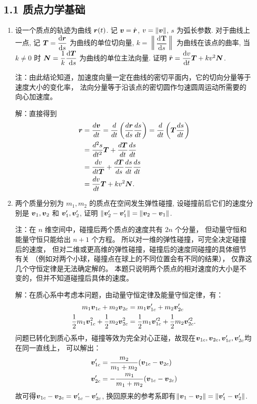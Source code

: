 \subsection{1.1 质点力学基础}
\begin{enumerate}
    \item 设一个质点的轨迹为曲线 $\boldsymbol{r}(t)$. 记 $\boldsymbol{v}=\dot{\boldsymbol{r}}$, $v=\|\boldsymbol{v}\|$, $s$ 为弧长参数.
    对于曲线上一点, 记 $\boldsymbol{T}=\dfrac{\mathrm{d} \boldsymbol{r}}{\mathrm{d} s}$ 为曲线的单位切向量, 
    $k=\left\|\dfrac{\mathrm{d} \boldsymbol{T}}{\mathrm{d} s}\right\|$ 为曲线在该点的曲率, 
    当 $k \neq 0$ 时 $\boldsymbol{N}=\dfrac{1}{k} \dfrac{\mathrm{d} \boldsymbol{T}}{\mathrm{~d} s}$ 为曲线的单位主法向量. 
    证明 $\ddot{\boldsymbol{r}}=\dfrac{\mathrm{d} v}{\mathrm{d} t} \boldsymbol{T}+k v^2 \boldsymbol{N}$.
    
    注：由此结论知道，加速度向量一定在曲线的密切平面内，它的切向分量等于速度大小的变化率，
    法向分量等于沿该点的密切圆作匀速圆周运动所需要的向心加速度。

    解：直接得到
    \begin{align*}
        \boldsymbol{r}&=\frac{d\boldsymbol{v}}{dt}=\frac{d}{dt}\left(\frac{d\boldsymbol{r}}{ds} \frac{ds}{dt}\right)
        =\frac{d}{dt}\left(\boldsymbol{T}\frac{ds}{dt}\right)\\
        &=\frac{d^2s}{dt^2}\boldsymbol{T}+\frac{d\boldsymbol{T}}{dt}\frac{ds}{dt}\\
        &=\frac{dv}{dt\boldsymbol{T}}+\frac{d\boldsymbol{T}}{ds}\frac{ds}{dt}\frac{ds}{dt}\\
        &=\frac{dv}{dt}\boldsymbol{T}+k v^2\boldsymbol{N}.
    \end{align*}

    \item 两个质量分别为 $m_1, m_2$ 的质点在空间发生弹性碰撞, 
    设碰撞前后它们的速度分别是 $\boldsymbol{v}_1, \boldsymbol{v}_2$ 和 $\boldsymbol{v}_1^{\prime}, \boldsymbol{v}_2^{\prime}$, 
    证明 $\|\boldsymbol{v}_2^{\prime}-\boldsymbol{v}_1^{\prime}\|=\|\boldsymbol{v}_2-\boldsymbol{v}_1\|$.
    
    注：在 $n$ 维空间中，碰撞后两个质点的速度共有 $2n$ 个分量，
    但动量守恒和能量守恒只能给出 $n+1$ 个方程。
    所以对一维的弹性碰撞，可完全决定碰撞后的速度，
    但对二维或更高维的弹性碰撞，碰撞后的速度同碰撞的具体细节有关
    （例如对两个小球，碰撞点在球上的不同位置会有不同的结果），
    仅靠这几个守恒定律是无法确定解的。
    本题只说明两个质点的相对速度的大小是不变的，但并不知道碰撞后具体的速度。

    解：在质心系中考虑本问题，由动量守恒定律及能量守恒定律，有：
    \begin{align*}
        m_1\boldsymbol{v}_{1c}+m_2\boldsymbol{v}_{2c}&=m_1\boldsymbol{v}_{1c}'+m_2\boldsymbol{v}_{2c}'\\
        \frac{1}{2}m_1\boldsymbol{v}_{1c}^2+\frac{1}{2}m_2\boldsymbol{v}_{2c}^2&
        =\frac{1}{2}m_1\boldsymbol{v}_{1c}'^2+\frac{1}{2}m_2\boldsymbol{v}_{2c}'^2.
    \end{align*}
    问题已转化到质心系中，碰撞等效为完全对心正碰，故现在$\boldsymbol{v}_{1c},\boldsymbol{v}_{2c},\boldsymbol{v}_{1c}',\boldsymbol{v}_{2c}'$均在同一直线上，
    可以解出：
    \begin{align*}
        \boldsymbol{v}_{1c}'&=\frac{m_2}{m_1+m_2}(\boldsymbol{v}_{1c}-\boldsymbol{v}_{2c})\\
        \boldsymbol{v}_{2c}'&=-\frac{m_1}{m_1+m_2}(\boldsymbol{v}_{1c}-\boldsymbol{v}_{2c})
    \end{align*}
    故可得$\boldsymbol{v}_{1c}-\boldsymbol{v}_{2c}=\boldsymbol{v}_{1c}'-\boldsymbol{v}_{2c}'$,
    换回原来的参考系即有$\|\boldsymbol{v}_1-\boldsymbol{v}_2\|=\|\boldsymbol{v}_1'-\boldsymbol{v}_2'\|$.


\end{enumerate}
